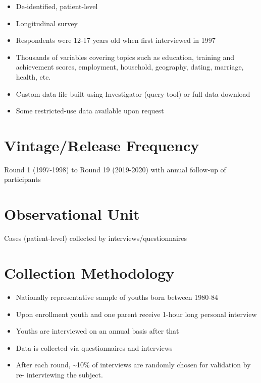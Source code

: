 \documentclass[
]{book}
\providecommand{\tightlist}{%
  \setlength{\itemsep}{0pt}\setlength{\parskip}{0pt}}
\begin{document}
\begin{itemize}
\tightlist
\item
  De-identified, patient-level
\item
  Longitudinal survey
\item
  Respondents were 12-17 years old when first interviewed in 1997
\item
  Thousands of variables covering topics such as education, training and achievement scores, employment, household, geography, dating, marriage, health, etc.
\item
  Custom data file built using Investigator (query tool) or full data download
\item
  Some restricted-use data available upon request
\end{itemize}

\hypertarget{vintagerelease-frequency-59}{%
\section{Vintage/Release Frequency}\label{vintagerelease-frequency-59}}

Round 1 (1997-1998) to Round 19 (2019-2020) with annual follow-up of participants

\hypertarget{observational-unit-59}{%
\section{Observational Unit}\label{observational-unit-59}}

Cases (patient-level) collected by interviews/questionnaires

\hypertarget{collection-methodology-59}{%
\section{Collection Methodology}\label{collection-methodology-59}}

\begin{itemize}
\tightlist
\item
  Nationally representative sample of youths born between 1980-84
\item
  Upon enrollment youth and one parent receive 1-hour long personal interview
\item
  Youths are interviewed on an annual basis after that
\item
  Data is collected via questionnaires and interviews
\item
  After each round, \textasciitilde10\% of interviews are randomly chosen for validation by re- interviewing the subject.
\end{itemize}
\end{document}
